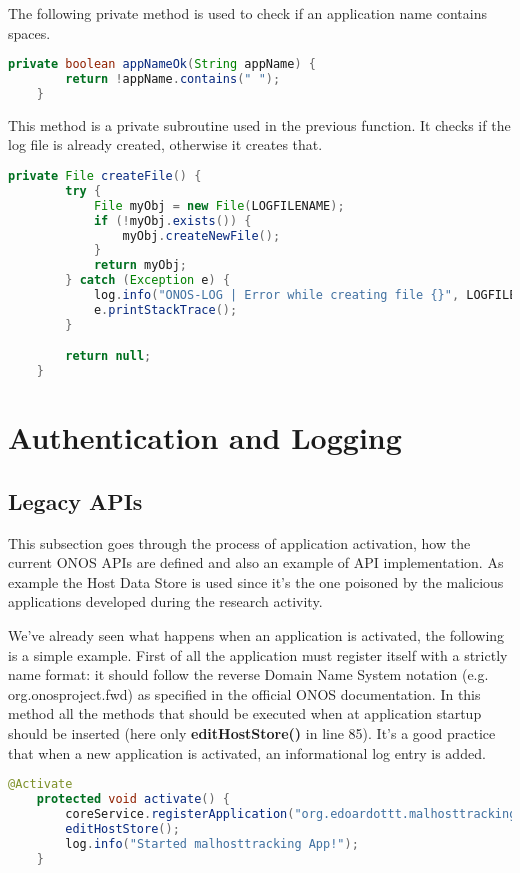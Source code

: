 \documentclass[a4paper,10pt]{memoir}
\begin{document}
The following private method is used to check if an application name contains spaces.
\begin{lstlisting}[language=java,firstnumber=127]
    private boolean appNameOk(String appName) {
        return !appName.contains(" ");
    }
\end{lstlisting}

This method is a private subroutine used in the previous function. It checks if the log file is already created, otherwise it creates that.
\begin{lstlisting}[language=java,firstnumber=131]
    private File createFile() {
        try {
            File myObj = new File(LOGFILENAME);
            if (!myObj.exists()) {
                myObj.createNewFile();
            }
            return myObj;
        } catch (Exception e) {
            log.info("ONOS-LOG | Error while creating file {}", LOGFILENAME);
            e.printStackTrace();
        }

        return null;
    }
\end{lstlisting}

\clearpage

\section{Authentication and Logging}

\subsection{Legacy APIs}
This subsection goes through the process of application activation, how the current ONOS APIs are defined and also an example of API implementation. As example the Host Data Store is used since it's the one poisoned by the malicious applications developed during the research activity.
\medskip

We've already seen what happens when an application is activated, the following is a simple example. First of all the application must register itself with a strictly name format: it should follow the reverse Domain Name System notation (e.g. org.onosproject.fwd) as specified in the official ONOS documentation. In this method all the methods that should be executed when at application startup should be inserted (here only \textbf{editHostStore()} in line 85). It's a good practice that when a new application is activated, an informational log entry is added.
\begin{lstlisting}[language=java,firstnumber=82]
    @Activate
    protected void activate() {
        coreService.registerApplication("org.edoardottt.malhosttracking.app")
        editHostStore();
        log.info("Started malhosttracking App!");
    }
\end{lstlisting}
\end{document}

